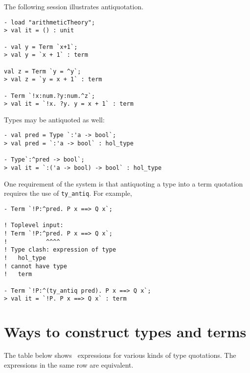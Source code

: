 The following session illustrates antiquotation.

\setcounter{sessioncount}{1}
\begin{session}\begin{verbatim}
- load "arithmeticTheory";
> val it = () : unit

- val y = Term `x+1`;
> val y = `x + 1` : term

val z = Term `y = ^y`;
> val z = `y = x + 1` : term

- Term `!x:num.?y:num.^z`;
> val it = `!x. ?y. y = x + 1` : term
\end{verbatim}\end{session}

\noindent Types may be antiquoted as well:

\setcounter{sessioncount}{1}
\begin{session}\begin{verbatim}
- val pred = Type `:'a -> bool`;
> val pred = `:'a -> bool` : hol_type

- Type`:^pred -> bool`;
> val it = `:('a -> bool) -> bool` : hol_type
\end{verbatim}\end{session}

One requirement of the system is that antiquoting a type into a term
quotation requires the use of {\small\verb+ty_antiq+}. For example,

\begin{session}\begin{verbatim}
- Term `!P:^pred. P x ==> Q x`;

! Toplevel input:
! Term `!P:^pred. P x ==> Q x`;
!           ^^^^
! Type clash: expression of type
!   hol_type
! cannot have type
!   term

- Term `!P:^(ty_antiq pred). P x ==> Q x`;
> val it = `!P. P x ==> Q x` : term
\end{verbatim}\end{session}



\section{Ways to construct types and terms}

The table below shows \ML\ expressions for various kinds of type
quotations.
The expressions in the same row are equivalent.

